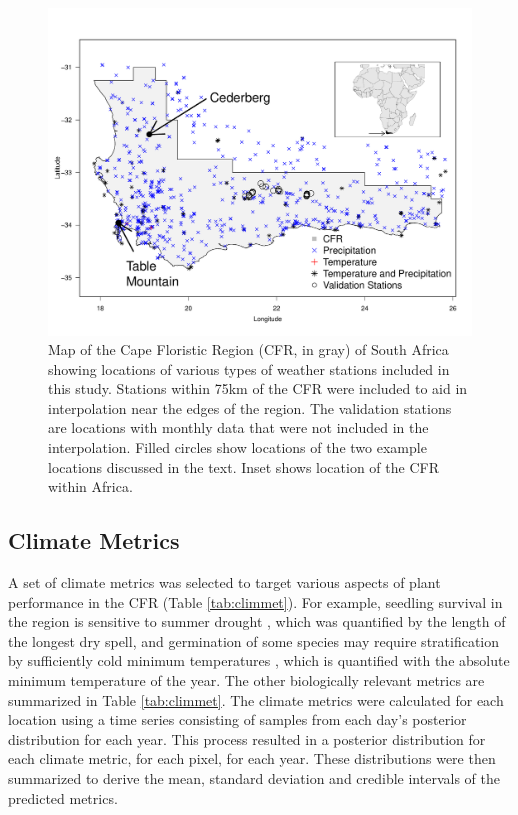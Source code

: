 \documentclass[12pt]{article}
\begin{document}
\begin{figure}
  \begin{center}
 \includegraphics[width=\textwidth]{Figure2.pdf} \caption{Map
   of the Cape Floristic Region (CFR, in gray) of South Africa showing locations of
   various types of weather stations included in this study.  Stations
   within 75km of the CFR were included to aid in interpolation near
   the edges of the region. The validation stations are locations with
   monthly data that were not included in the interpolation.  
   Filled circles show locations of the two example
   locations discussed in the text. 
   Inset shows location of the CFR within Africa.}
    \label{fig:wmap}
\end{center}
\end{figure}


\subsection{Climate Metrics}

A set of climate metrics was selected to target various aspects of
plant performance in the CFR (Table \ref{tab:climmet}). For example,
seedling survival in the region is sensitive to summer drought
\citep{midgley_mortality_1988}, which was quantified by the length of the
longest dry spell, and germination of some species may require
stratification by sufficiently cold minimum temperatures
\citep{keeley_convergent_1997}, which is quantified with the absolute
minimum temperature of the year.   The other biologically relevant metrics are summarized in Table \ref{tab:climmet}. 
The climate metrics were calculated for each location using a time series consisting of samples from each day's posterior
distribution for each year.  
This process resulted in a posterior distribution
for each climate metric, for each pixel, for each year.  
These distributions were then summarized to derive the mean, standard
deviation and credible intervals of the predicted metrics.  
\end{document}
